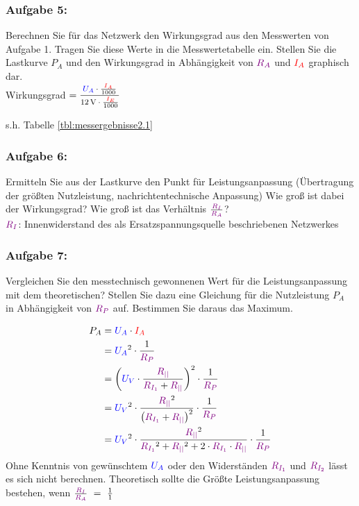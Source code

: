 \documentclass[11pt,a4paper,titlepage]{scrreprt}
\begin{document}
           \subsubsection{Aufgabe 5:} Berechnen Sie für das Netzwerk den Wirkungsgrad aus den Messwerten von Aufgabe 1. Tragen Sie diese Werte in die Messwertetabelle ein. Stellen Sie die Lastkurve $P_A$ und den Wirkungsgrad in Abhängigkeit von $\textcolor{violet}{R_A}$ und $\textcolor{red}{I_A}$ graphisch dar.\\
           Wirkungsgrad $=\mfrac{\spannung{U_A} \cdot \frac{\strom{I_A}}{1000}}{\SI{12}{\volt} \cdot \frac{\strom{I_E}}{1000}}$
           
           s.h. Tabelle \ref{tbl:messergebnisse2.1}


           \subsubsection{Aufgabe 6:} Ermitteln Sie aus der Lastkurve den Punkt für Leistungsanpassung (Übertragung der größten Nutzleistung, nachrichtentechnische Anpassung) Wie groß ist dabei der Wirkungsgrad? Wie groß ist das Verhältnis $\frac{\textcolor{violet}{R_I}}{\textcolor{violet}{R_A}}$?\\
           $\textcolor{violet}{R_I}$: Innenwiderstand des als Ersatzspannungsquelle beschriebenen Netzwerkes
           

           \subsubsection{Aufgabe 7:} Vergleichen Sie den messtechnisch gewonnenen Wert für die Leistungsanpassung mit dem theoretischen? Stellen Sie dazu eine Gleichung für die Nutzleistung $P_A$ in Abhängigkeit von $\textcolor{violet}{R_P}$ auf. Bestimmen Sie daraus das Maximum.
           
           \begin{align*}
               P_A  &= \textcolor{blue}{U_A} \cdot \textcolor{red}{I_A}\\
               &= \textcolor{blue}{U_A}^2 \cdot \frac{1}{\textcolor{violet}{R_P}}\\
               &= \left(\textcolor{blue}{U_V} \cdot \frac{\textcolor{violet}{R_{||}}}{\textcolor{violet}{R_{I_1}} + \textcolor{violet}{R_{||}}}\right)^2 \cdot \frac{1}{\textcolor{violet}{R_P}}\\
               &= \textcolor{blue}{U_V}^2 \cdot \frac{\textcolor{violet}{R_{||}}^2}{\left(\textcolor{violet}{R_{I_1}} + \textcolor{violet}{R_{||}}\right)^2} \cdot \frac{1}{\textcolor{violet}{R_P}}\\
               &= \textcolor{blue}{U_V}^2 \cdot \frac{\textcolor{violet}{R_{||}}^2}{\textcolor{violet}{R_{I_1}}^2 + \textcolor{violet}{R_{||}}^2 + 2 \cdot \textcolor{violet}{R_{I_1}}\cdot \textcolor{violet}{R_{||}}} \cdot \frac{1}{\textcolor{violet}{R_P}}\\
           \end{align*}
           Ohne Kenntnis von gewünschtem $\textcolor{blue}{U_A}$ oder den Widerständen $\textcolor{violet}{R_{I_1}}$ und $\textcolor{violet}{R_{I_2}}$ lässt es sich nicht berechnen. Theoretisch sollte die Größte Leistungsanpassung bestehen, wenn $\frac{\textcolor{violet}{R_I}}{\textcolor{violet}{R_A}}~=~\frac{1}{1}$
\end{document}
